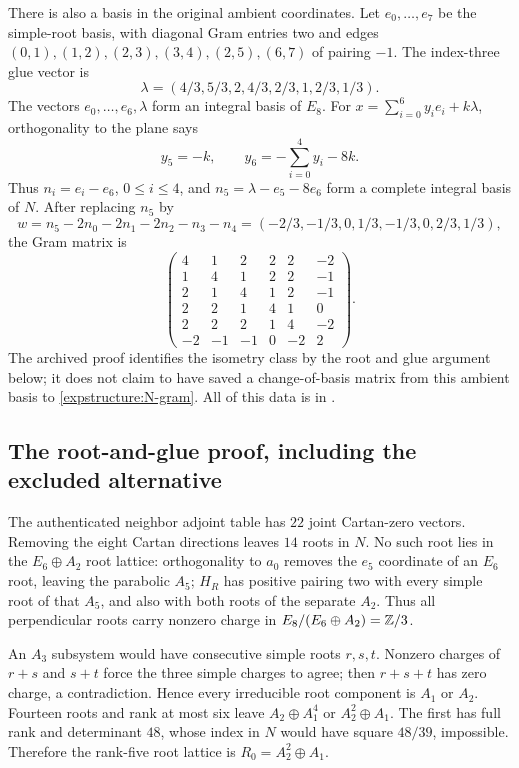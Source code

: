 There is also a basis in the original ambient coordinates.
Let $e_0,\ldots,e_7$ be the simple-root basis, with diagonal Gram
entries two and edges
$(0,1),(1,2),(2,3),(3,4),(2,5),(6,7)$ of pairing $-1$.
The index-three glue vector is
\[
 \lambda=(4/3,5/3,2,4/3,2/3,1,2/3,1/3).
\]
The vectors $e_0,\ldots,e_6,\lambda$ form an integral basis of
$E_8$. For $x=\sum_{i=0}^6y_ie_i+k\lambda$, orthogonality to
the plane says
\[
 y_5=-k,\qquad y_6=-\sum_{i=0}^4y_i-8k.
\]
Thus $n_i=e_i-e_6$, $0\le i\le4$, and
$n_5=\lambda-e_5-8e_6$ form a complete integral basis of $N$.
After replacing $n_5$ by
\[
 w=n_5-2n_0-2n_1-2n_2-n_3-n_4
   =(-2/3,-1/3,0,1/3,-1/3,0,2/3,1/3),
\]
the Gram matrix is
\[
\begin{pmatrix}
4&1&2&2&2&-2\\
1&4&1&2&2&-1\\
2&1&4&1&2&-1\\
2&2&1&4&1&0\\
2&2&2&1&4&-2\\
-2&-1&-1&0&-2&2
\end{pmatrix}.
\]
The archived proof identifies the isometry class by the root and
glue argument below; it does not claim to have saved a change-of-basis
matrix from this ambient basis to \eqref{expstructure:N-gram}.
All of this data is in
.

\subsection{The root-and-glue proof, including the excluded alternative}

The authenticated neighbor adjoint table has $22$ joint
Cartan-zero vectors. Removing the eight Cartan directions leaves
$14$ roots in $N$. No such root lies in the $E_6\oplus A_2$
root lattice: orthogonality to $a_0$ removes the $e_5$ coordinate
of an $E_6$ root, leaving the parabolic $A_5$; $H_R$ has positive
pairing two with every simple root of that $A_5$, and also with
both roots of the separate $A_2$. Thus all perpendicular roots
carry nonzero charge in $E_8/(E_6\oplus A_2)=\mathbb Z/3$.

An $A_3$ subsystem would have consecutive simple roots
$r,s,t$. Nonzero charges of $r+s$ and $s+t$ force the three
simple charges to agree; then $r+s+t$ has zero charge, a
contradiction. Hence every irreducible root component is $A_1$
or $A_2$. Fourteen roots and rank at most six leave
$A_2\oplus A_1^4$ or $A_2^2\oplus A_1$. The first has full
rank and determinant $48$, whose index in $N$ would have square
$48/39$, impossible. Therefore the rank-five root lattice is
$R_0=A_2^2\oplus A_1$.

